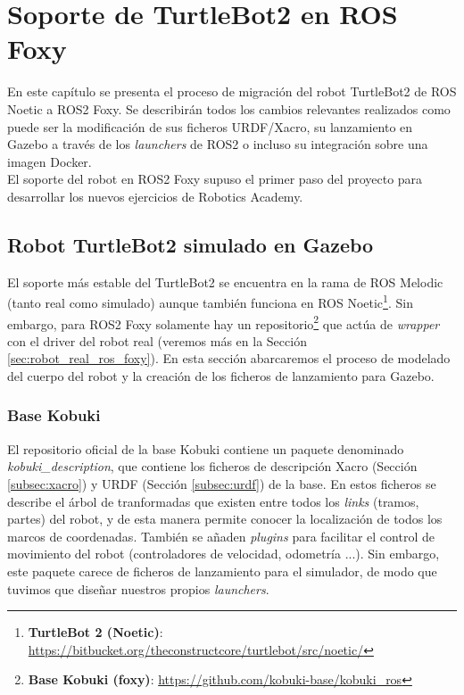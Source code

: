 \chapter{Soporte de TurtleBot2 en ROS Foxy}
\label{cap:capitulo4}

En este capítulo se presenta el proceso de migración del robot TurtleBot2 de ROS Noetic a ROS2 Foxy. Se describirán todos los cambios relevantes realizados como puede ser la modificación de sus ficheros URDF/Xacro, su lanzamiento en Gazebo a través de los \textit{launchers} de ROS2 o incluso su integración sobre una imagen Docker.\\

El soporte del robot en ROS2 Foxy supuso el primer paso del proyecto para desarrollar los nuevos ejercicios de Robotics Academy.\\




\section{Robot TurtleBot2 simulado en Gazebo}
\label{sec:robot_simulado_gazebo}
El soporte más estable del TurtleBot2 se encuentra en la rama de ROS Melodic (tanto real como simulado) aunque también funciona en ROS Noetic\footnote{\textbf{TurtleBot 2 (Noetic)}: \url{https://bitbucket.org/theconstructcore/turtlebot/src/noetic/}}. Sin embargo, para ROS2 Foxy solamente hay un repositorio\footnote{\textbf{Base Kobuki (foxy)}: \url{https://github.com/kobuki-base/kobuki_ros}} que actúa de \textit{wrapper} con el driver del robot real (veremos más en la Sección \ref{sec:robot_real_ros_foxy}). En esta sección abarcaremos el proceso de modelado del cuerpo del robot y la creación de los ficheros de lanzamiento para Gazebo.\\


\subsection{Base Kobuki}
\label{subsec:kobuki_base_simulado}

El repositorio oficial de la base Kobuki contiene un paquete denominado \textit{kobuki\_description}, que contiene los ficheros de descripción Xacro (Sección \ref{subsec:xacro}) y URDF (Sección \ref{subsec:urdf}) de la base. En estos ficheros se describe el árbol de tranformadas que existen entre todos los \textit{links} (tramos, partes) del robot, y de esta manera permite conocer la localización de todos los marcos de coordenadas. También se añaden \textit{plugins} para facilitar el control de movimiento del robot (controladores de velocidad, odometría ...). Sin embargo, este paquete carece de ficheros de lanzamiento para el simulador, de modo que tuvimos que diseñar nuestros propios \textit{launchers}.\\

